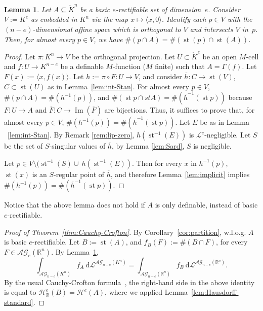 \documentclass[a4paper, 12pt, final]{article}
\newtheorem{lem}{Lemma}[section]
\newtheorem{open problem}[lem]{Open problem}
\theoremstyle{remark}
\theoremstyle{definition}
\newtheorem{final remark}[lem]{Final remark}
\begin{document}
\begin{lem}\label{lem:card}
Let $A \subseteq {\mathring {K}}^n$ be a {basic $e$-rectifiable\xspace} set of dimension~$e$.
Consider $V := {K}^e$ as embedded in ${K}^n$ via the map
$x \mapsto {\langle {x, 0} \rangle}$.
Identify each $p \in V$ with the $(n-e)$-dimensional affine space which is
orthogonal to $V$ and intersects $V$ in~$p$.
Then, for almost every $p \in V$, we have
$\#(p \cap A) = \#(\operatorname{st}(p) \cap \operatorname{st}(A))$.
\end{lem}

\begin{proof}
Let $\pi: {K}^n \to V$ be the orthogonal projection.
Let $U \subset {\mathring {K}}^e$ be an open $M$-cell and $f: U \to {K}^{n-e}$ be
a definable $M$-function ($M$ finite) such that $A = \Gamma(f)$. 
Let $F(x) := {\langle {x, f(x)} \rangle}$.
Let $h := \pi \circ F: U \to V$, and consider ${\overline{h}}: C\to \operatorname{st}(V)$,
$C\subset\operatorname{st}(U)$ as in Lemma~\ref{lem:int-Stan}. 
For almost every $p \in V$, $\#(p \cap A) = \#(h^{-1}(p))$, 
and $\#(\operatorname{st} p \cap st A) = \#({\overline{h}}^{-1}(\operatorname{st} p))$
because $F: U \to A$ and  ${\overline{F}}: C \to \operatorname{Im}({\overline{F}})$ are bijections.
Thus, it suffices to prove that, for almost every $p \in V$,
$\#(h^{-1}(p)) = \#({\overline{h}}^{-1}(\operatorname{st} p))$.  Let $E$ be as in Lemma ~\ref{lem:int-Stan}. By Remark \ref{rem:lip-zero}, $h(\operatorname{st}^{-1}(E))$ is ${\mathcal L}^e$-negligible. Let $S$ be the set of $S$-singular values of ${\overline{h}}$, by Lemma \ref{lem:Sard}, $S$ is negligible.

Let $p \in V \setminus (\operatorname{st}^{-1}(S)\cup~ h(\operatorname{st}^{-1}(E))$. Then for  every $x$ in $h^{-1}(p)$, ~$\operatorname{st}(x)$ is  an $S$-regular point of ${\overline{h}}$, and therefore  Lemma~\ref{lem:implicit} implies $\#(h^{-1}(p)) = \#({\overline{h}}^{-1}(\operatorname{st} p))$.
\end{proof}
Notice that the above lemma does not hold if $A$ is only definable, instead of 
{basic $e$-rectifiable\xspace}.

\begin{proof}[Proof of Theorem~\ref{thm:Cauchy-Crofton}]
By Corollary~\ref{cor:partition}, {w.l.o.g\mbox{.}\xspace} $A$ is {basic $e$-rectifiable\xspace}.
Let $B := \operatorname{st}(A)$, and $f_B(F) := \#(B \cap F)$, for every 
$F \in {\mathcal{AG}}_e({\mathbb{R}}^n)$.
By Lemma~\ref{lem:card},
\[
\int_{{\mathcal{AG}}_{n-e}({K}^n)} f_A {\:\mathrm d} {\mathcal L}^{{\mathcal{AG}}_{n-e}({K}^n)} =
\int_{{\mathcal{AG}}_{n-e}({\mathbb{R}}^n)} f_B {\:\mathrm d} {\mathcal L}^{{\mathcal{AG}}_{n-e}({\mathbb{R}}^n)}.
\]
By the usual Cauchy-Crofton formula~\cite[3.16]{morgan}, the right-hand side
in the above identity is equal to ${\mathcal H}^e_{\mathbb{R}}(B) = {\mathcal H}^e(A)$, where we
applied Lemma~\ref{lem:Hausdorff-standard}.
\end{proof}
\end{document}
